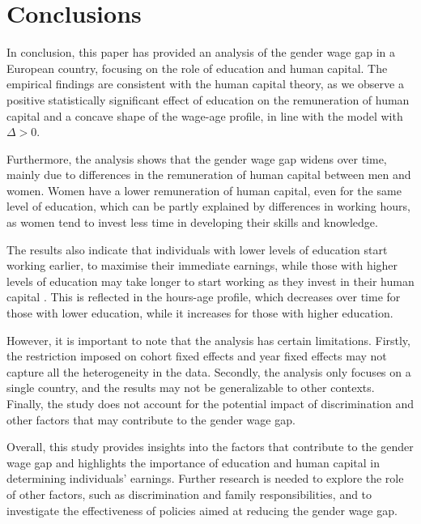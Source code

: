 \documentclass[12pt]{article}
\begin{document}
\section{Conclusions}
In conclusion, this paper has provided an analysis of the gender wage gap in a European country, focusing on the role of
education and human capital. The empirical findings are consistent with the human capital theory, as we observe a
positive statistically significant effect of education on the remuneration of human capital and a concave shape of the
wage-age profile, in line with the model with $\Delta > 0$.
\par
Furthermore, the analysis shows that the gender wage gap widens over time, mainly due to differences in the remuneration
of human capital between men and women. Women have a lower remuneration of human capital, even for the same level of
education, which can be partly explained by differences in working hours, as women tend to invest less time in
developing their skills and knowledge.
\par
The results also indicate that individuals with lower levels of education start working earlier, to maximise their
immediate earnings, while those with higher levels of education may take longer to start working as
they invest in their human capital \citep{ben1967production}. This is reflected in the hours-age profile, which decreases over time for those with
lower education, while it increases for those with higher education.
\par
However, it is important to note that the analysis has certain limitations. Firstly, the restriction imposed on cohort
fixed effects and year fixed effects may not capture all the heterogeneity in the data. Secondly, the analysis
only focuses on a single country, and the results may not be generalizable to other contexts. Finally, the study does
not account for the potential impact of discrimination and other factors that may contribute to the gender wage gap.
\par
Overall, this study provides insights into the factors that contribute to the gender wage gap and highlights the
importance of education and human capital in determining individuals' earnings. Further research is needed to explore
the role of other factors, such as discrimination and family responsibilities, and to investigate the effectiveness of
policies aimed at reducing the gender wage gap.






\newpage
\medskip

\newpage
\end{document}
